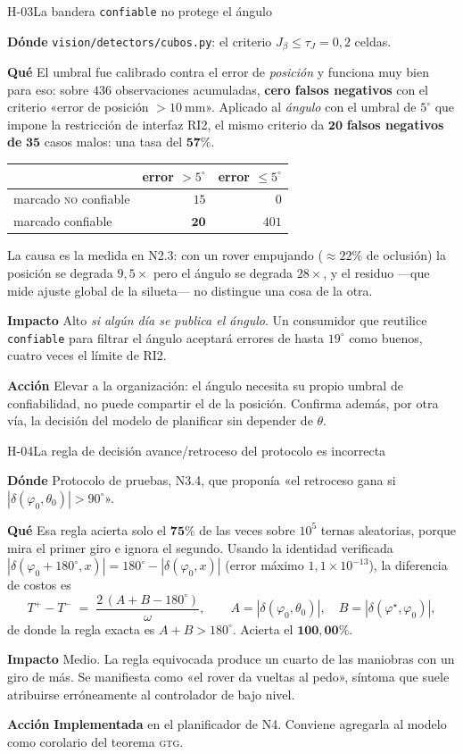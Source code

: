 \documentclass[11pt,a4paper]{article}
\newcommand{\grados}{^{\circ}}
\newcommand{\campo}[1]{\par\smallskip\noindent\textbf{#1}\quad\ignorespaces}
\begin{document}
\begin{hallazgo}{H-03}{La bandera \texttt{confiable} no protege el ángulo}
\campo{Dónde} \texttt{vision/detectors/cubos.py}: el criterio
$J_\beta \le \tau_J = 0{,}2$ celdas.
\campo{Qué} El umbral fue calibrado contra el error de \emph{posición} y funciona muy
bien para eso: sobre $436$ observaciones acumuladas, \textbf{cero falsos negativos} con
el criterio «error de posición $>10\ \mathrm{mm}$». Aplicado al \emph{ángulo} con el
umbral de $5\grados$ que impone la restricción de interfaz RI2, el mismo criterio da
$\mathbf{20}$ \textbf{falsos negativos de} $\mathbf{35}$ casos malos: una tasa del
$\mathbf{57\%}$.

\medskip
\centering
\begin{tabular}{lrr}
\toprule
& error $>5\grados$ & error $\le5\grados$ \\
\midrule
marcado \textsc{no} confiable & $15$ & $0$ \\
marcado confiable & $\mathbf{20}$ & $401$ \\
\bottomrule
\end{tabular}

\raggedright
\medskip
La causa es la medida en N2.3: con un rover empujando ($\approx22\%$ de oclusión) la
posición se degrada $9{,}5\times$ pero el ángulo se degrada $28\times$, y el residuo
---que mide ajuste global de la silueta--- no distingue una cosa de la otra.
\campo{Impacto} Alto \emph{si algún día se publica el ángulo}. Un consumidor que
reutilice \texttt{confiable} para filtrar el ángulo aceptará errores de hasta
$19\grados$ como buenos, cuatro veces el límite de RI2.
\campo{Acción} Elevar a la organización: el ángulo necesita su propio umbral de
confiabilidad, no puede compartir el de la posición. Confirma además, por otra vía, la
decisión del modelo de planificar sin depender de $\theta$.
\end{hallazgo}

\begin{hallazgo}{H-04}{La regla de decisión avance/retroceso del protocolo es incorrecta}
\campo{Dónde} Protocolo de pruebas, N3.4, que proponía «el retroceso gana si
$|\delta(\varphi_0,\theta_0)| > 90\grados$».
\campo{Qué} Esa regla acierta solo el $\mathbf{75\%}$ de las veces sobre $10^5$ ternas
aleatorias, porque mira el primer giro e ignora el segundo. Usando la identidad
verificada $|\delta(\varphi_0+180\grados, x)| = 180\grados - |\delta(\varphi_0,x)|$
(error máximo $1{,}1\times10^{-13}$), la diferencia de costos es
\[
  T^{+} - T^{-} \;=\; \frac{2\,(A + B - 180\grados)}{\omega},
  \qquad A = |\delta(\varphi_0,\theta_0)|,\quad B = |\delta(\varphi^\star,\varphi_0)|,
\]
de donde la regla exacta es $A+B>180\grados$. Acierta el $\mathbf{100{,}00\%}$.
\campo{Impacto} Medio. La regla equivocada produce un cuarto de las maniobras con un
giro de más. Se manifiesta como «el rover da vueltas al pedo», síntoma que suele
atribuirse erróneamente al controlador de bajo nivel.
\campo{Acción} \textbf{Implementada} en el planificador de N4. Conviene agregarla al
modelo como corolario del teorema \textsc{gtg}.
\end{hallazgo}
\end{document}

